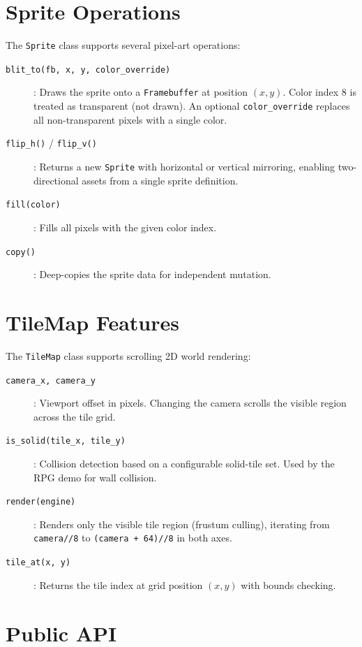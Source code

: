 \documentclass[10pt,a4paper,twoside]{book}
\begin{document}
\section{Sprite Operations}

The \texttt{Sprite} class supports several pixel-art operations:
\begin{description}
    \item[\texttt{blit\_to(fb, x, y, color\_override)}]: Draws the sprite onto a
          \texttt{Framebuffer} at position $(x, y)$. Color index 8 is treated as
          transparent (not drawn). An optional \texttt{color\_override} replaces
          all non-transparent pixels with a single color.
    \item[\texttt{flip\_h()} / \texttt{flip\_v()}]: Returns a new \texttt{Sprite}
          with horizontal or vertical mirroring, enabling two-directional assets
          from a single sprite definition.
    \item[\texttt{fill(color)}]: Fills all pixels with the given color index.
    \item[\texttt{copy()}]: Deep-copies the sprite data for independent mutation.
\end{description}

\section{TileMap Features}

The \texttt{TileMap} class supports scrolling 2D world rendering:
\begin{description}
    \item[\texttt{camera\_x, camera\_y}]: Viewport offset in pixels. Changing
          the camera scrolls the visible region across the tile grid.
    \item[\texttt{is\_solid(tile\_x, tile\_y)}]: Collision detection based on a
          configurable solid-tile set. Used by the RPG demo for wall collision.
    \item[\texttt{render(engine)}]: Renders only the visible tile region
          (frustum culling), iterating from \texttt{camera//8} to
          \texttt{(camera + 64)//8} in both axes.
    \item[\texttt{tile\_at(x, y)}]: Returns the tile index at grid position
          $(x, y)$ with bounds checking.
\end{description}

\section{Public API}
\end{document}
